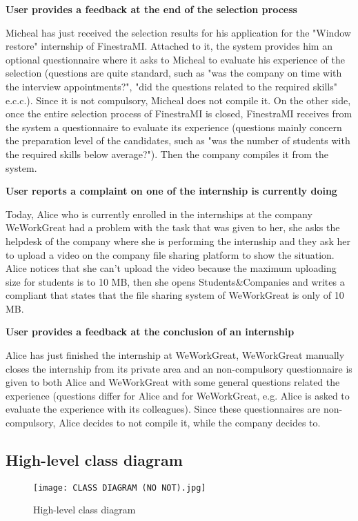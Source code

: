		\textbf{User provides a feedback at the end of the selection process}
		\begin{flushleft}
			Micheal has just received the selection results for his application for the "Window restore" internship of FinestraMI. Attached to it, the system provides him an optional questionnaire where it asks to Micheal to evaluate his experience of the selection (questions are quite standard, such as "was the company on time with the interview appointments?", "did the questions related to the required skills" e.c.c.). Since it is not compulsory, Micheal does not compile it. On the other side, once the entire selection process of FinestraMI is closed, FinestraMI receives from the system a questionnaire to evaluate its experience (questions mainly concern the preparation level of the candidates, such as "was the number of students with the required skills below average?"). Then the company compiles it from the system.
		\end{flushleft}
		\textbf{User reports a complaint on one of the internship is currently doing}
		\begin{flushleft}
			Today, Alice who is currently enrolled in the internships at the company WeWorkGreat had a problem with the task that was given to her, she asks the helpdesk of the company where she is performing the internship and they ask her to upload a video on the company file sharing platform to show the situation. Alice notices that she can’t upload the video because the maximum uploading size for students is to 10 MB, then she opens Students\&Companies and writes a compliant that states that the file sharing system of WeWorkGreat is only of 10 MB.
		\end{flushleft}
		\textbf{User provides a feedback at the conclusion of an internship}
		\begin{flushleft}
			Alice has just finished the internship at WeWorkGreat, WeWorkGreat manually closes the internship from its private area and an non-compulsory questionnaire is given to both Alice and WeWorkGreat with some general questions related the experience (questions differ for Alice and for WeWorkGreat, e.g. Alice is asked to evaluate the experience with its colleagues). Since these questionnaires are non-compulsory, Alice decides to not compile it, while the company decides to.
		\end{flushleft}
		\subsection{High-level class diagram}
			\begin{figure}[H]
				\centering
				\texttt{[image: CLASS DIAGRAM (NO NOT).jpg]}
				\caption{High-level class diagram}
			\end{figure}
			
